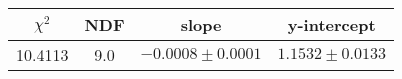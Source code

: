 \begin{tabular}{|c|c|c|c|}

\hline
$\chi^{2}$ & NDF & slope & y-intercept  \\
\hline
10.4113 & 9.0 & $-0.0008\pm0.0001$ & $1.1532\pm0.0133$ \\
\hline

\end{tabular}
